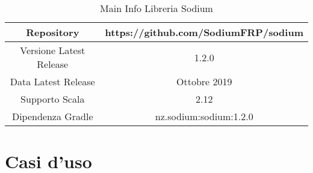 \documentclass[../main.tex]{subfiles}
\begin{document}
\begin{table}[H]
\centering
\begin{tabular}{|c|c|}
     \hline
     Repository & https://github.com/SodiumFRP/sodium \\
     \hline
     Versione Latest Release & 1.2.0 \\
     \hline
     Data Latest Release & Ottobre 2019 \\
     \hline
     Supporto Scala & 2.12 \\
     \hline
     Dipendenza Gradle & nz.sodium:sodium:1.2.0 \\
     \hline
\end{tabular}
\caption{Main Info Libreria Sodium}
\end{table}


\section{Casi d'uso}
\end{document}
